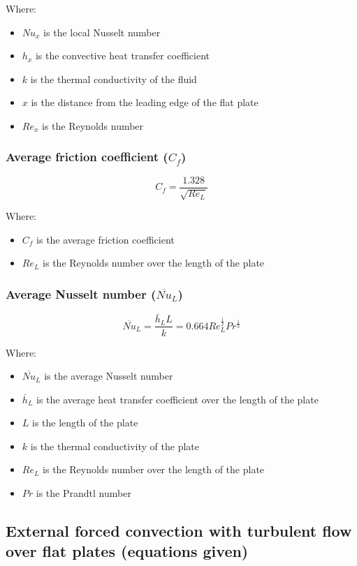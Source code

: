 \documentclass[11pt]{article}
\begin{document}
Where:
\begin{itemize}
\item \(Nu_x\) is the local Nusselt number
\item \(h_x\) is the convective heat transfer coefficient
\item \(k\) is the thermal conductivity of the fluid
\item \(x\) is the distance from the leading edge of the flat plate
\item \(Re_x\) is the Reynolds number
\end{itemize}

\subsubsection{Average friction coefficient (\(C_f\))}
\label{sec:orgad6aa66}
\[C_f = \frac{1.328}{\sqrt{Re_L}}\]

Where:
\begin{itemize}
\item \(C_f\) is the average friction coefficient
\item \(Re_L\) is the Reynolds number over the length of the plate
\end{itemize}

\subsubsection{Average Nusselt number (\(\overline{Nu}_L\))}
\label{sec:orga61ea0e}
\[\overline{Nu}_L = \frac{\bar{h}_L L}{k} = 0.664 Re_L^{\frac{1}{2}} Pr^{\frac{1}{3}}\]

Where:
\begin{itemize}
\item \(\overline{Nu}_L\) is the average Nusselt number
\item \(\bar{h}_L\) is the average heat transfer coefficient over the length of the plate
\item \(L\) is the length of the plate
\item \(k\) is the thermal conductivity of the plate
\item \(Re_L\) is the Reynolds number over the length of the plate
\item \(Pr\) is the Prandtl number
\end{itemize}

\subsection{External forced convection with turbulent flow over flat plates (equations given)}
\label{sec:org5cf895f}
\end{document}

